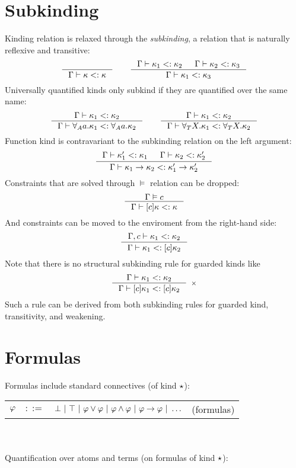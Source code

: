 \documentclass[english, mgr]{iithesis}
\begin{document}
\section{Subkinding}
Kinding relation is relaxed through the \textit{subkinding},
a relation that is naturally reflexive and transitive:
$$
\inference{
}{
  \cEnv \vdash \kind \subkind \kind
}
\qquad
\inference{
  \cEnv \vdash \kind_1 \subkind \kind_2 &
  \cEnv \vdash \kind_2 \subkind \kind_3
}{
  \cEnv \vdash \kind_1 \subkind \kind_3
}
$$
Universally quantified kinds only subkind if they are quantified over the same name:
$$
\inference{
  \cEnv \vdash \kind_1 \subkind \kind_2
}{
  \cEnv \vdash \kForallAtom{\atomv} \kind_1 \subkind \kForallAtom{\atomv} \kind_2
}
\qquad
\inference{
  \cEnv \vdash \kind_1 \subkind \kind_2
}{
  \cEnv \vdash \kForallTerm{\termv} \kind_1 \subkind \kForallTerm{\termv} \kind_2
}
$$
Function kind is contravariant to the subkinding relation on the left argument:
$$
\inference{
  \cEnv \vdash \kind_1' \subkind \kind_1 &
  \cEnv \vdash \kind_2 \subkind \kind_2'
}{
  \cEnv \vdash \kind_1 \karrow \kind_2 \subkind \kind_1' \karrow \kind_2'
}
$$
Constraints that are solved through $\vDash$ relation can be dropped:
$$
\inference{
  \cEnv \vDash \constr
}{
  \cEnv \vdash \kGuard{\constr}\kind \subkind \kind
}
$$
And constraints can be moved to the enviroment from the right-hand side:
$$
\inference{
  \cEnv, \constr \vdash \kind_1 \subkind \kind_2
}{
  \cEnv \vdash \kind_1 \subkind \kGuard{\constr}\kind_2
}
$$
Note that there is no structural subkinding rule for guarded kinds like
$$
\inference{\cEnv \vdash \kind_1 \subkind \kind_2}{
  \cEnv \vdash \kGuard{\constr} \kind_1 \subkind \kGuard{\constr} \kind_2
}[\ensuremath{\times}]
$$
Such a rule can be derived from both subkinding rules for guarded kind,
transitivity, and weakening.

\section{Formulas}
Formulas include standard connectives (of kind $\star$):

\begin{tabular}{rrlr}
$\varphi$ & $::=$ & $\bot
               \ |\  \top
               \ |\  \varphi \vee \varphi
               \ |\  \varphi \wedge \varphi
               \ |\  \varphi \to \varphi
               \ |\  \ldots $ & (formulas)
\end{tabular}
\\ \\
Quantification over atoms and terms (on formulas of kind $\star$):
\end{document}
